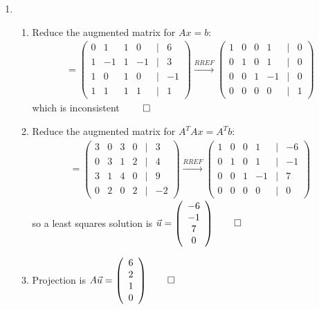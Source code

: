 \documentclass[12pt, a4paper]{article}
\begin{document}
\begin{enumerate}[Q\arabic*.]
  \item 
    \begin{enumerate}[(\alph*)]
      \item Reduce the augmented matrix for $Ax = b$:
        \begin{align*}
          [A \mid b] = \left(\begin{array}{cccccc} 0 & 1 & 1 & 0 &|& 6\\ 1 & -1 & 1 & -1 &|& 3\\ 1 & 0 & 1 & 0 &|& -1\\ 1 & 1 & 1 & 1 &|& 1 \end{array}\right) \xrightarrow{RREF} \left(\begin{array}{cccccc} 1 & 0 & 0 & 1 &|& 0\\ 0 & 1 & 0 & 1 &|& 0\\ 0 & 0 & 1 & -1 &|& 0\\ 0 & 0 & 0 & 0 &|& 1 \end{array}\right)
        \end{align*}
        which is inconsistent $\qed$

      \item Reduce the augmented matrix for $A^TAx = A^Tb$:
        \begin{align*}
          [A^TA \mid A^Tb] = \left(\begin{array}{cccccc} 3 & 0 & 3 & 0 &|& 3\\ 0 & 3 & 1 & 2 &|& 4\\ 3 & 1 & 4 & 0 &|& 9\\ 0 & 2 & 0 & 2 &|& -2 \end{array}\right) \xrightarrow{RREF} \left(\begin{array}{cccccc} 1 & 0 & 0 & 1 &|& -6\\ 0 & 1 & 0 & 1 &|& -1\\ 0 & 0 & 1 & -1 &|& 7\\ 0 & 0 & 0 & 0 &|& 0 \end{array}\right)
        \end{align*}
        so a least squares solution is $\vec{u} = \left(\begin{array}{c} -6\\ -1\\ 7\\ 0 \end{array}\right) \qed$

      \item Projection is $A \vec{u} = \left(\begin{array}{c} 6\\ 2\\ 1\\ 0 \end{array}\right) \qed$
    \end{enumerate}


\end{enumerate}
\end{document}
